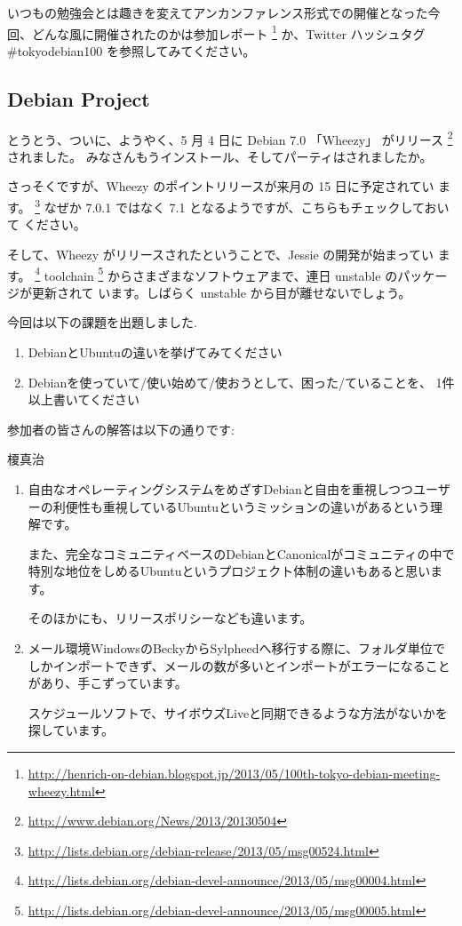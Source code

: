 \documentclass[mingoth,a4paper]{jsarticle}
\begin{document}
いつもの勉強会とは趣きを変えてアンカンファレンス形式での開催となった今
回、どんな風に開催されたのかは参加レポート
\footnote{\url{http://henrich-on-debian.blogspot.jp/2013/05/100th-tokyo-debian-meeting-wheezy.html}}
か、Twitter ハッシュタグ \#tokyodebian100 を参照してみてください。


\subsection{Debian Project}

とうとう、ついに、ようやく、5 月 4 日に Debian 7.0 「Wheezy」 がリリース
\footnote{\url{http://www.debian.org/News/2013/20130504}}
されました。
みなさんもうインストール、そしてパーティはされましたか。

さっそくですが、Wheezy のポイントリリースが来月の 15 日に予定されてい
ます。
\footnote{\url{http://lists.debian.org/debian-release/2013/05/msg00524.html}}
なぜか 7.0.1 ではなく 7.1 となるようですが、こちらもチェックしておいて
ください。

そして、Wheezy がリリースされたということで、Jessie の開発が始まってい
ます。
\footnote{\url{http://lists.debian.org/debian-devel-announce/2013/05/msg00004.html}}
toolchain
\footnote{\url{http://lists.debian.org/debian-devel-announce/2013/05/msg00005.html}}
からさまざまなソフトウェアまで、連日 unstable のパッケージが更新されて
います。しばらく unstable から目が離せないでしょう。



今回は以下の課題を出題しました.
\begin{screen}
  \begin{enumerate}
  \item %
    DebianとUbuntuの違いを挙げてみてください
  \item %
    Debianを使っていて/使い始めて/使おうとして、困った/ていることを、
    1件以上書いてください
  \end{enumerate}
\end{screen}
参加者の皆さんの解答は以下の通りです:

\begin{prework}{ 榎真治 }
  \begin{enumerate}
  \item 自由なオペレーティングシステムをめざすDebianと自由を重視しつつユーザーの利便性も重視しているUbuntuというミッションの違いがあるという理解です。

    また、完全なコミュニティベースのDebianとCanonicalがコミュニティの中で特別な地位をしめるUbuntuというプロジェクト体制の違いもあると思います。

    そのほかにも、リリースポリシーなども違います。

  \item メール環境WindowsのBeckyからSylpheedへ移行する際に、フォルダ単位でしかインポートできず、メールの数が多いとインポートがエラーになることがあり、手こずっています。

    スケジュールソフトで、サイボウズLiveと同期できるような方法がないかを探しています。
  \end{enumerate}
\end{prework}
\end{document}
